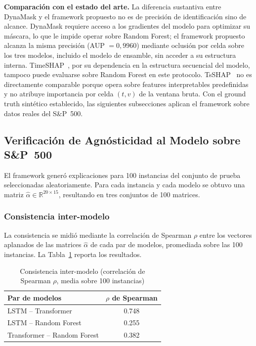 \documentclass[conference, letterpaper]{IEEEtran}
\begin{document}
\textbf{Comparación con el estado del arte.} La diferencia sustantiva
entre DynaMask y el framework propuesto no es de precisión de
identificación sino de alcance. DynaMask requiere acceso a los
gradientes del modelo para optimizar su máscara, lo que le impide
operar sobre Random Forest; el framework propuesto alcanza la misma
precisión (AUP $= 0{,}9960$) mediante oclusión por celda sobre los
tres modelos, incluido el modelo de ensamble, sin acceder a su
estructura interna. TimeSHAP~\cite{bento2021}, por su dependencia en
la estructura secuencial del modelo, tampoco puede evaluarse sobre
Random Forest en este protocolo. TsSHAP~\cite{raykar2023} no es
directamente comparable porque opera sobre features interpretables
predefinidas y no atribuye importancia por celda $(t, v)$ de la
ventana bruta. Con el ground truth sintético establecido, las
siguientes subsecciones aplican el framework sobre datos reales del
S\&P~500.

\subsection{Verificación de Agnósticidad al Modelo sobre S\&P~500}
\label{sec:verificacion_agnosticidad}

El framework generó explicaciones para 100 instancias del conjunto 
de prueba seleccionadas aleatoriamente. Para cada instancia y cada 
modelo se obtuvo una matriz $\hat{\alpha} \in \mathbb{R}^{20 \times 
15}$, resultando en tres conjuntos de 100 matrices.

\subsubsection{Consistencia inter-modelo}

La consistencia se midió mediante la correlación de Spearman $\rho$ 
entre los vectores aplanados de las matrices $\hat{\alpha}$ de cada 
par de modelos, promediada sobre las 100 instancias. La 
Tabla~\ref{tab:consistencia} reporta los resultados.

\begin{table}[h]
\centering
\caption{Consistencia inter-modelo (correlación de Spearman $\rho$, 
media sobre 100 instancias)}
\label{tab:consistencia}
\begin{tabular}{lc}
\toprule
\textbf{Par de modelos} & \textbf{$\rho$ de Spearman} \\
\midrule
LSTM -- Transformer          & 0.748 \\
LSTM -- Random Forest        & 0.255 \\
Transformer -- Random Forest & 0.382 \\
\bottomrule
\end{tabular}
\end{table}
\end{document}
